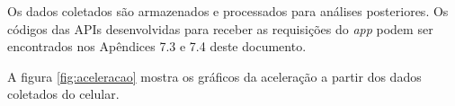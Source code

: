 Os dados coletados são armazenados e processados para análises posteriores. Os códigos das APIs desenvolvidas para receber as requisições do \textit{app} podem ser encontrados nos Apêndices 7.3 e 7.4 deste documento.


A figura \ref{fig:aceleracao} mostra os gráficos da aceleração a partir dos dados coletados do celular. 





